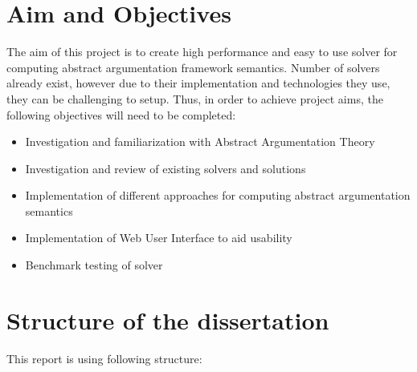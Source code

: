 \section{Aim and Objectives}
The aim of this project is to create high performance and easy to use solver for computing abstract argumentation framework semantics. Number of solvers already exist, however due to their implementation and technologies they use, they can be challenging to setup. Thus, in order to achieve project aims, the following objectives will need to be completed:
\begin{itemize}
	\item Investigation and familiarization with Abstract Argumentation Theory
	\item Investigation and review of existing solvers and solutions
	\item Implementation of different approaches for computing abstract argumentation semantics
	\item Implementation of Web User Interface to aid usability
	\item Benchmark testing of solver
\end{itemize}

\section{Structure of the dissertation}
This report is using following structure:

